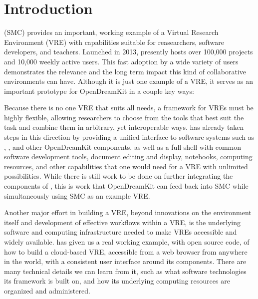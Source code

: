 \documentclass{deliverablereport}
\author{ }
\begin{document}
\maketitle
%
\strut\githubissuedescription
\newpage\tableofcontents\newpage

\section{Introduction}


\SMC (SMC) provides an important, working example of a Virtual Research
Environment (VRE)
with capabilities suitable for reasearchers, software developers, and teachers.
Launched in 2013, \SMC presently hosts over 100,000 projects and 10,000 weekly
active users. This fast adoption by a wide variety of users demonstrates the
relevance and the long term impact this kind of collaborative environments can
have.  Although it is just one example of a VRE, it serves as an important
prototype for OpenDreamKit in a couple key ways: 

Because there is no one VRE that suits all needs, a framework for VREs must be
highly flexible, allowing researchers to choose from the tools that best suit
the task and combine them in arbitrary, yet interoperable ways.  \SMC has
already taken steps in this direction by providing a unified interface to
software systems such as \Sage, \GAP, and other OpenDreamKit components, as
well as a full \Linux shell with common software development tools, \LATEX
document editing and display, \Jupyter notebooks, computing resources, and
other capabilities that one would need for a VRE with unlimited possibilities.
While there is still work to be done on further integrating the components of
\SMC, this is work that OpenDreamKit can feed back into SMC while
simultaneously using SMC as an example VRE.

Another major effort in building a VRE, beyond innovations on the environment
itself and development of effective workflows within a VRE, is the underlying
software and computing infrastructure needed to make VREs accessible and widely
available.  \SMC has given us a real working example, with open source code, of
how to build a cloud-based VRE, accessible from a web browser from anywhere in
the world, with a consistent user interface around its components.  There are
many technical details we can learn from it, such as what software technologies
its framework is built on, and how its underlying computing resources are
organized and administered.
\end{document}
